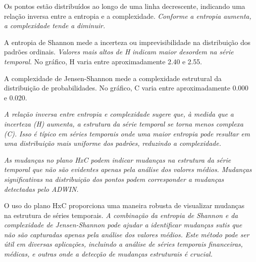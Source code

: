 \documentclass[
]{article}
\begin{document}
Os pontos estão distribuídos ao longo de uma linha decrescente,
indicando uma relação inversa entre a entropia e a complexidade.
\emph{Conforme a entropia aumenta, a complexidade tende a diminuir.}

A entropia de Shannon mede a incerteza ou imprevisibilidade na
distribuição dos padrões ordinais. \emph{Valores mais altos de H indicam
maior desordem na série temporal.} No gráfico, H varia entre
aproximadamente 2.40 e 2.55.

A complexidade de Jensen-Shannon mede a complexidade estrutural da
distribuição de probabilidades. No gráfico, C varia entre
aproximadamente 0.000 e 0.020.

\emph{A relação inversa entre entropia e complexidade sugere que, à
medida que a incerteza (H) aumenta, a estrutura da série temporal se
torna menos complexa (C). Isso é típico em séries temporais onde uma
maior entropia pode resultar em uma distribuição mais uniforme dos
padrões, reduzindo a complexidade.}

\emph{As mudanças no plano HxC podem indicar mudanças na estrutura da
série temporal que não são evidentes apenas pela análise dos valores
médios. Mudanças significativas na distribuição dos pontos podem
corresponder a mudanças detectadas pelo ADWIN.}

O uso do plano HxC proporciona uma maneira robusta de visualizar
mudanças na estrutura de séries temporais. \emph{A combinação da
entropia de Shannon e da complexidade de Jensen-Shannon pode ajudar a
identificar mudanças sutis que não são capturadas apenas pela análise
dos valores médios. Este método pode ser útil em diversas aplicações,
incluindo a análise de séries temporais financeiras, médicas, e outras
onde a detecção de mudanças estruturais é crucial.}
\end{document}
